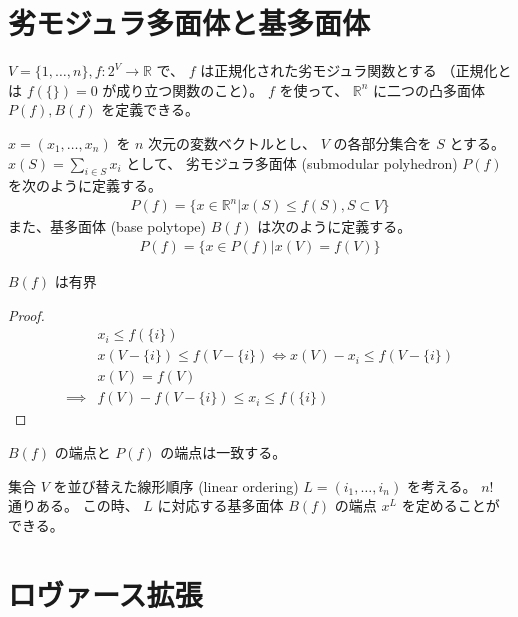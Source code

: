 \documentclass{classes/report}
\begin{document}
\section{劣モジュラ多面体と基多面体}

$V=\{1, \dots, n\}, f: 2^V \to \mathbb{R}$ で、 $f$ は正規化された劣モジュラ関数とする
（正規化とは $f(\{\})=0$ が成り立つ関数のこと）。
$f$ を使って、 $\mathbb{R}^n$ に二つの凸多面体 $P(f), B(f)$ を定義できる。

\begin{tcolorbox}
    \begin{Def}
        $x=(x_1, \dots, x_n)$ を $n$ 次元の変数ベクトルとし、 $V$ の各部分集合を $S$ とする。
        $x(S) = \sum_{i \in S} x_i$ として、
        劣モジュラ多面体 (submodular polyhedron) $P(f)$ を次のように定義する。
        \begin{align}
            P(f) = \{ x \in \mathbb{R}^n | x(S) \le f(S), S \subset V \}
        \end{align}
        また、基多面体 (base polytope) $B(f)$ は次のように定義する。
        \begin{align}
            P(f) = \{ x \in P(f) | x(V) = f(V) \}
        \end{align}
    \end{Def}
\end{tcolorbox}

\begin{prop}
    $B(f)$ は有界
\end{prop}

\begin{proof}
    \begin{align*}
        &x_i \le f(\{i\}) \\
        &x(V-\{i\}) \le f(V-\{i\}) \iff x(V) - x_i \le f(V-\{i\}) \\
        &x(V) = f(V) \\
        \implies &f(V) - f(V-\{i\}) \le x_i \le f(\{i\})
    \end{align*}
\end{proof}

\begin{prop}
    $B(f)$ の端点と $P(f)$ の端点は一致する。
\end{prop}

集合 $V$ を並び替えた線形順序 (linear ordering) $L=(i_1, \dots, i_n)$ を考える。 $n!$ 通りある。
この時、 $L$ に対応する基多面体 $B(f)$ の端点 $x^L$ を定めることができる。

\section{ロヴァース拡張}
\end{document}
